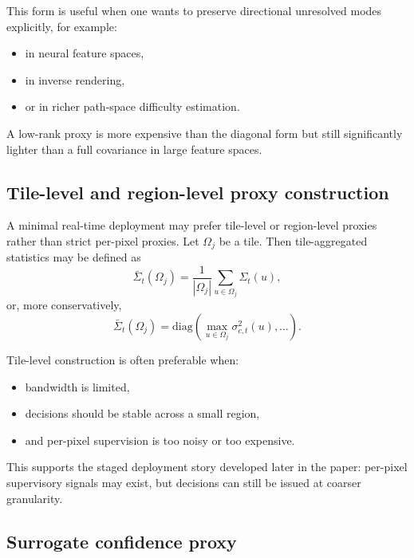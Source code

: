 \documentclass[11pt,letterpaper]{article}
\theoremstyle{gcresult}
\theoremstyle{definition}
\begin{document}
This form is useful when one wants to preserve directional unresolved modes explicitly, for example:
\begin{itemize}[leftmargin=1.5em]
    \item in neural feature spaces,
    \item in inverse rendering,
    \item or in richer path-space difficulty estimation.
\end{itemize}

A low-rank proxy is more expensive than the diagonal form but still significantly lighter than a full covariance in large feature spaces.


\subsection{Tile-level and region-level proxy construction}

A minimal real-time deployment may prefer tile-level or region-level proxies rather than strict per-pixel proxies. Let $\Omega_j$ be a tile. Then tile-aggregated statistics may be defined as
\begin{equation}
\bar{\Sigma}_t(\Omega_j)=\frac{1}{|\Omega_j|}\sum_{u\in\Omega_j}\Sigma_t(u),
\end{equation}
or, more conservatively,
\begin{equation}
\bar{\Sigma}_t(\Omega_j)=\mathrm{diag}\!\left(
\max_{u\in\Omega_j}\sigma^{2}_{c,t}(u),\dots
\right).
\end{equation}

Tile-level construction is often preferable when:
\begin{itemize}[leftmargin=1.5em]
    \item bandwidth is limited,
    \item decisions should be stable across a small region,
    \item and per-pixel supervision is too noisy or too expensive.
\end{itemize}

This supports the staged deployment story developed later in the paper: per-pixel supervisory signals may exist, but decisions can still be issued at coarser granularity.


\subsection{Surrogate confidence proxy}
\end{document}
